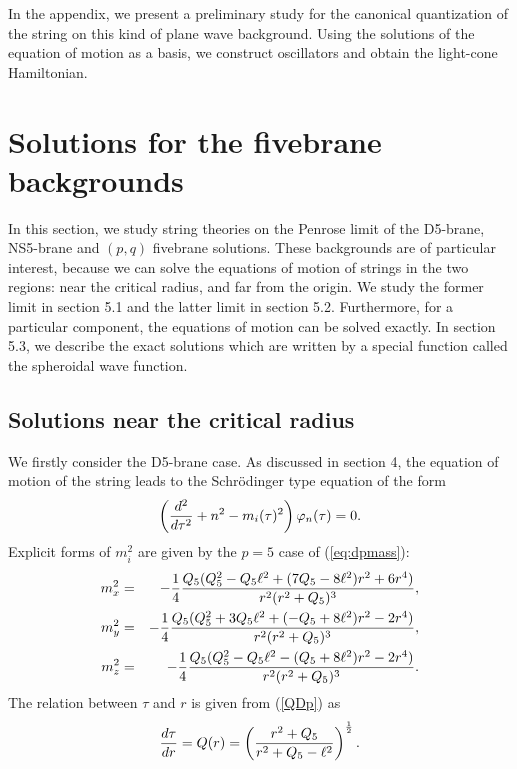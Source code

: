 \documentclass[a4paper,12pt]{article}
\begin{document}
In the appendix, we present a preliminary study for the canonical
quantization of the string on this kind of plane wave background.
Using the solutions of the equation of motion as a basis,
we construct oscillators and obtain the light-cone Hamiltonian.


\section{Solutions for the fivebrane backgrounds}
In this section, we study string theories on the 
Penrose limit of the D5-brane, NS5-brane and $(p,q)$ 
fivebrane solutions. 
These backgrounds are of particular interest, because 
we can solve the equations of motion of strings 
in the two regions: near the critical radius, and
far from the origin.
We study the former limit in section 5.1 and
the latter limit in section 5.2.
Furthermore, for a particular component,
the equations of motion can be solved exactly.
In section 5.3, we describe the exact solutions
which are written
by a special function called the spheroidal wave function.

\subsection{Solutions near the critical radius}
We firstly consider the D5-brane case.
As discussed in section 4, the equation of motion of the
string leads to the Schr{\"o}dinger type equation of the form
\begin{equation}
\left({d^2\over d\tau^2}+n^2-m_{i}(\tau)^2 \right) 
\varphi_{n}(\tau)=0.
\label{eq:schroe}
\end{equation}
Explicit forms of $m_{i}^2$ are given by 
the $p=5$ case of (\ref{eq:dpmass}):
\begin{eqnarray}
 m_{x}^{2}&=&-{1\over4}{Q_{5}(Q_{5}^2-Q_{5}\ell^2
+(7Q_{5}-8\ell^2)r^2+6r^4)\over r^2(r^2+Q_{5})^3},
\label{eq:mxD5}\\
m_{y}^{2}&=&-{1\over4}{Q_{5}(Q_{5}^2+3Q_{5}\ell^2
+(-Q_{5}+8\ell^2)r^2-2r^4)\over r^2(r^2+Q_{5})^3},
\label{eq:myD5}\\
m_{z}^{2}&=&-{1\over4}{Q_{5}(Q_{5}^2-Q_{5}\ell^2
-(Q_{5}+8\ell^2)r^2-2r^4)\over r^2(r^2+Q_{5})^3}.
\label{eq:mzD5}
\end{eqnarray}
The relation between $\tau$ and $r$ is given from
(\ref{QDp}) as
\begin{equation}
{d\tau\over dr}=Q(r)
=\left({r^2+Q_{5}\over r^2+Q_{5}-\ell^2}\right)^{1\over2}.
\label{eq:QrD5}
\end{equation}
\end{document}
